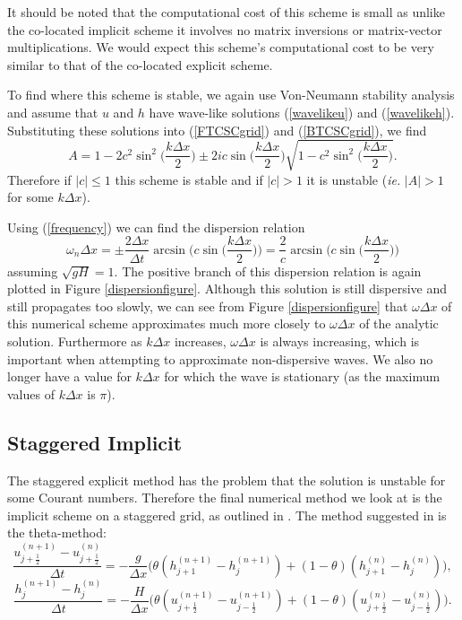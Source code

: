 \documentclass[a4paper, 10pt, notitlepage]{article}
\begin{document}
It should be noted that the computational cost of this scheme is small as unlike the co-located implicit scheme it involves no matrix inversions or matrix-vector multiplications. We would expect this scheme's computational cost to be very similar to that of the co-located explicit scheme.

To find where this scheme is stable, we again use Von-Neumann stability analysis and assume that $u$ and $h$ have wave-like solutions (\ref{wavelikeu}) and (\ref{wavelikeh}). Substituting these solutions into (\ref{FTCSCgrid}) and (\ref{BTCSCgrid}), we find
\begin{equation}
A = 1 - 2c^{2}\sin^{2}\bigg(\frac{k\Delta x}{2}\bigg) \pm 2ic\sin\bigg(\frac{k\Delta x}{2}\bigg) \sqrt{1 - c^{2}\sin^{2}\bigg(\frac{k\Delta x}{2}\bigg)}.
\end{equation}
Therefore if $\lvert c \rvert \leq 1$ this scheme is stable and if $\lvert c \rvert > 1$ it is unstable  (\textit{ie.} $\vert A \rvert > 1$ for some $k\Delta x$).

Using (\ref{frequency}) we can find the dispersion relation
\begin{equation}
	\omega_{n} \Delta x = \pm\frac{2\Delta x}{\Delta t} \arcsin\bigg(c\sin\bigg(\frac{k\Delta x}{2}\bigg)\bigg) = \frac{2}{c} \arcsin\bigg(c\sin\bigg(\frac{k\Delta x}{2}\bigg)\bigg) 
\end{equation}
assuming $\sqrt{gH} = 1$. The positive branch of this dispersion relation is again plotted in Figure \ref{dispersionfigure}. Although this solution is still dispersive and still propagates too slowly, we can see from Figure \ref{dispersionfigure} that $\omega\Delta x$ of this numerical scheme approximates much more closely to $\omega\Delta x$ of the analytic solution. Furthermore as $k\Delta x$ increases, $\omega\Delta x$ is always increasing, which is important when attempting to approximate non-dispersive waves. We also no longer have a value for $k\Delta x$ for which the wave is stationary (as the maximum values of $k\Delta x$ is $\pi$).

\subsection{Staggered Implicit}
The staggered explicit method has the problem that the solution is unstable for some Courant numbers. Therefore the final numerical method we look at is the implicit scheme on a staggered grid, as outlined in \cite{implicit}. The method suggested in \cite{implicit} is the theta-method:
\begin{equation}
\frac{u_{j + \frac{1}{2}}^{(n + 1)} - u_{j + \frac{1}{2}}^{(n)}}{\Delta t} = -\frac{g}{\Delta x} \bigg(\theta (h_{j + 1}^{(n+ 1)} - h_{j}^{(n+ 1)}) + (1 - \theta) (h_{j + 1}^{(n)} - h_{j}^{(n)})\bigg),
\end{equation}
\begin{equation}
\frac{h_{j}^{(n + 1)} - h_{j}^{(n)}}{\Delta t} = -\frac{H}{\Delta x} \bigg(\theta (u_{j + \frac{1}{2}}^{(n+ 1)} - u_{j - \frac{1}{2}}^{(n+ 1)}) + (1 - \theta) (u_{j + \frac{1}{2}}^{(n)} - u_{j - \frac{1}{2}}^{(n)})\bigg).
\end{equation}
\end{document}
